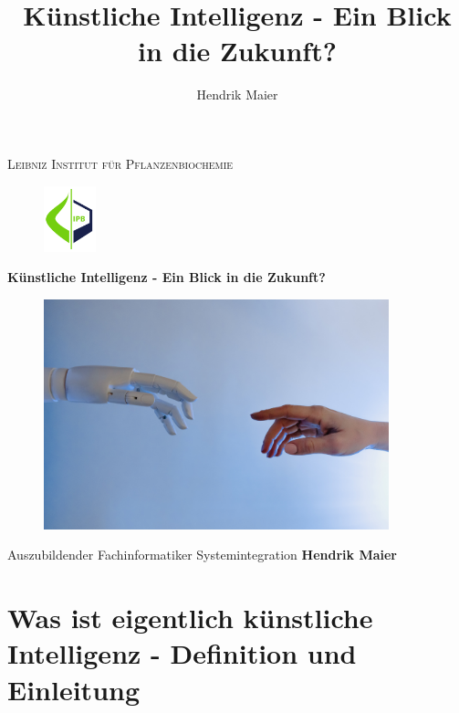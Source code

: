 \documentclass[12pt,german,ngerman]{report}
\title{Künstliche Intelligenz - Ein Blick in die Zukunft?}
\author{Hendrik Maier}
\date{}
\begin{document}
    \begin{titlepage}
        \centering
        {\scshape\LARGE Leibniz Institut für Pflanzenbiochemie\par}
        \vspace{1cm}
        \begin{figure}[h]
            \includegraphics[width=1.5cm]{ipb_logo.png}
            \centering
        \end{figure}
        {\huge\bfseries Künstliche Intelligenz - Ein Blick in die Zukunft?\par}
        \vspace{1cm}
        \begin{figure}[h]
            \includegraphics[width=10cm]{michelangelo_ki.jpg}
            \centering
        \end{figure}
        \vspace{1cm}
        {\Large Auszubildender Fachinformatiker Systemintegration \textbf{Hendrik Maier}\par}
        \vfill

    \end{titlepage}

    \tableofcontents
    \newpage

\chapter{Was ist eigentlich künstliche Intelligenz - Definition und Einleitung}

\end{document}
